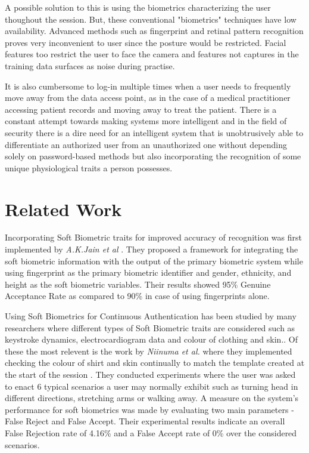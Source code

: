 \documentclass[%
        final,
        notitlepage,
        narroweqnarray,
        inline,
        ]{ieee}
\begin{document}
A possible solution to this is using the biometrics characterizing the user thoughout the session.
But, these conventional "biometrics" techniques have low availability. 
Advanced methods such as fingerprint and retinal pattern recognition proves very inconvenient to user since the posture would be restricted.
Facial features too restrict the user to face the camera and features not captures in the training data surfaces as noise during practise.

It is also cumbersome to log-in multiple times when a user needs to frequently move away from the data access point, as in the case of a medical practitioner accessing patient records and moving away to treat the patient.
There is a constant attempt towards making systems more intelligent and in the field of security there is a dire need for an intelligent system that is unobtrusively able to differentiate an authorized user from an unauthorized one without depending solely on password-based methods but also incorporating the recognition of some unique physiological traits a person possesses.


\section{Related Work} \label{sec:related}
Incorporating Soft Biometric traits for improved accuracy of recognition was first implemented by \emph{A.K.Jain et al} \cite{Jain204}.
They proposed a framework for integrating the soft biometric information with the output of the primary biometric system while using fingerprint as the primary biometric identifier and gender, ethnicity, and height as the soft biometric variables.
Their results showed 95\% Genuine Acceptance Rate as compared to 90\% in case of using fingerprints alone. 

Using Soft Biometrics for Continuous Authentication has been studied by many researchers where different types of Soft Biometric traits are considered such as keystroke dynamics, electrocardiogram data and colour of clothing and skin.\cite{mon00,ecd,Niin10}.
Of these the most relevent is the work by \emph{Niinuma et al.} where they implemented checking the colour of shirt and skin continually to match the template created at the start of the session \cite{Niin10}.
They conducted experiments where the user was asked to enact 6 typical scenarios a user may normally exhibit such as turning head in different directions, stretching arms or walking away.
A measure on the system's performance for soft biometrics was made by evaluating two main parameters - False Reject and False Accept.
Their experimental results indicate an overall False Rejection rate of 4.16\% and a False Accept rate of 0\% over the considered scenarios.
\end{document}
